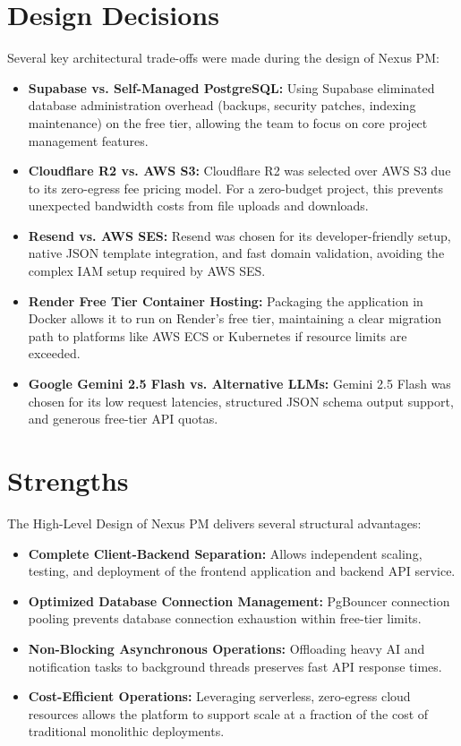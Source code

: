 \section{Design Decisions}
Several key architectural trade-offs were made during the design of Nexus PM:
\begin{itemize}
    \item \textbf{Supabase vs. Self-Managed PostgreSQL:} Using Supabase eliminated database administration overhead (backups, security patches, indexing maintenance) on the free tier, allowing the team to focus on core project management features.
    \item \textbf{Cloudflare R2 vs. AWS S3:} Cloudflare R2 was selected over AWS S3 due to its zero-egress fee pricing model. For a zero-budget project, this prevents unexpected bandwidth costs from file uploads and downloads.
    \item \textbf{Resend vs. AWS SES:} Resend was chosen for its developer-friendly setup, native JSON template integration, and fast domain validation, avoiding the complex IAM setup required by AWS SES.
    \item \textbf{Render Free Tier Container Hosting:} Packaging the application in Docker allows it to run on Render's free tier, maintaining a clear migration path to platforms like AWS ECS or Kubernetes if resource limits are exceeded.
    \item \textbf{Google Gemini 2.5 Flash vs. Alternative LLMs:} Gemini 2.5 Flash was chosen for its low request latencies, structured JSON schema output support, and generous free-tier API quotas.
\end{itemize}

\section{Strengths}
The High-Level Design of Nexus PM delivers several structural advantages:
\begin{itemize}
    \item \textbf{Complete Client-Backend Separation:} Allows independent scaling, testing, and deployment of the frontend application and backend API service.
    \item \textbf{Optimized Database Connection Management:} PgBouncer connection pooling prevents database connection exhaustion within free-tier limits.
    \item \textbf{Non-Blocking Asynchronous Operations:} Offloading heavy AI and notification tasks to background threads preserves fast API response times.
    \item \textbf{Cost-Efficient Operations:} Leveraging serverless, zero-egress cloud resources allows the platform to support scale at a fraction of the cost of traditional monolithic deployments.
\end{itemize}

